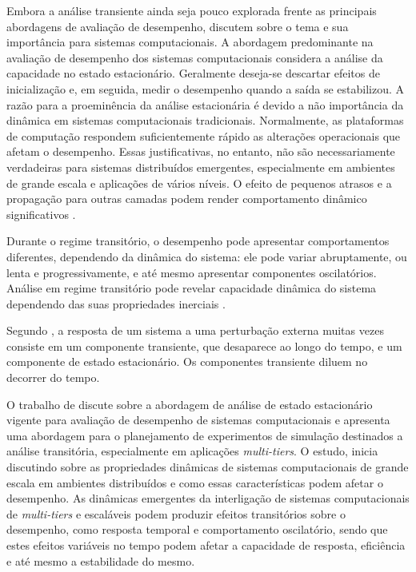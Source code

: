 Embora a análise transiente ainda seja pouco explorada frente as principais abordagens de avaliação de desempenho,  discutem sobre o tema e sua importância para sistemas computacionais. A abordagem predominante na avaliação de desempenho dos sistemas computacionais considera a análise da capacidade no estado estacionário. Geralmente deseja-se descartar efeitos de inicialização e, em seguida, medir o desempenho quando a saída se estabilizou. A razão para a proeminência da análise estacionária é devido a não importância da dinâmica em sistemas computacionais tradicionais. Normalmente, as plataformas de computação respondem suficientemente rápido as alterações operacionais que afetam o desempenho. Essas justificativas, no entanto, não são necessariamente verdadeiras para sistemas distribuídos emergentes, especialmente em ambientes de grande escala e aplicações de vários níveis. O efeito de pequenos atrasos e a propagação para outras camadas podem render comportamento dinâmico significativos \cite{Lourenco2015}.

Durante o regime transitório, o desempenho pode apresentar comportamentos diferentes, dependendo da dinâmica do sistema: ele pode variar abruptamente, ou lenta e progressivamente, e até mesmo apresentar componentes oscilatórios. Análise em regime transitório pode revelar capacidade dinâmica do sistema dependendo das suas propriedades inerciais \cite{Lourenco2015}.

Segundo , a resposta de um sistema a uma perturbação externa muitas vezes consiste em um componente transiente, que desaparece ao longo do tempo, e um componente de estado estacionário. Os componentes transiente diluem no decorrer do tempo. 

O trabalho de  discute sobre a abordagem de análise de estado estacionário vigente para avaliação de desempenho de sistemas computacionais e apresenta uma abordagem para o planejamento de experimentos de simulação destinados a análise transitória, especialmente em aplicações \textit{multi-tiers}.
O estudo, inicia discutindo sobre as propriedades dinâmicas de sistemas computacionais de grande escala em ambientes distribuídos e como essas características podem afetar o desempenho. As dinâmicas emergentes da interligação de sistemas computacionais de \textit{multi-tiers} e escaláveis podem produzir efeitos transitórios sobre o desempenho, como resposta temporal e comportamento oscilatório, sendo que estes efeitos variáveis no tempo podem afetar a capacidade de resposta, eficiência e até mesmo a estabilidade do mesmo. 

